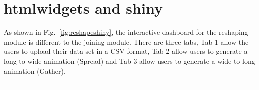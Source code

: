 \newpage

\section{\textbf{htmlwidgets} and \textbf{shiny}} \label{sreshapehtmlwidget}
As shown in Fig.~\ref{fig:reshapeshiny}, the  interactive dashboard for the reshaping module is different to the joining module. There are three tabs, Tab 1 allow the users to upload their data set in a CSV format, Tab 2 allow users to generate a long to wide animation (Spread) and Tab 3 allow users to generate a wide to long animation (Gather).

\begin{figure}[H]
    \centering
    \begin{tabular}{ccc}
     \includegraphics[scale
\end{tabular}
\end{figure}
